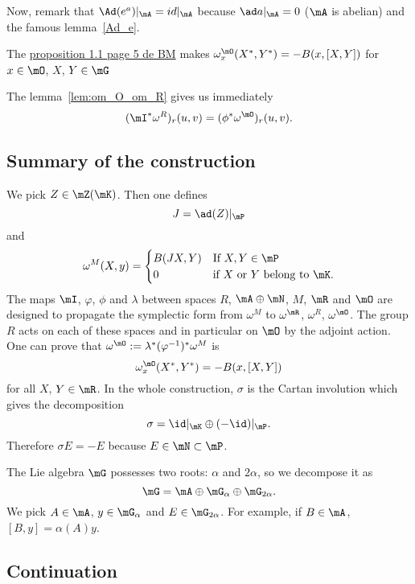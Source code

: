 Now, remark that $\Ad(e^a)|_{\mA}=id|_{\mA}$ because $\ad a|_{\mA}=0$ ($\mA$ is abelian) and
the famous lemma~\ref{Ad_e}.

The \underline{proposition 1.1 page 5 de BM} makes $\omega_x^{\mO}(X^*,Y^*)=-B(x,[X,Y])$ for $x\in\mO$, $X$, $Y\in\mG$

The lemma~\ref{lem:om_O_om_R} gives us immediately
\[
   (\mI^*\omega^R)_r(u,v)=(\phi^*\omega^{\mO})_r(u,v).
\]
\subsection{Summary of the construction}

We pick $Z\in\mZ(\mK)$. Then one defines
\[
  J=\ad(Z)|_{\mP}
\]
and
\[
  \omega^M(X,y)=
\begin{cases}
 B(JX,Y)&\text{If }X,Y\in\mP\\
 0&\text{if }X \text{ or } Y \text{ belong to }\mK.
\end{cases}
\]
The maps $\mI$, $\varphi$, $\phi$ and $\lambda$ between spaces $R$, $\mA\oplus\mN$, $M$, $\mR$ and $\mO$ are designed to propagate the symplectic form from $\omega^M$ to $\omega^{\mR}$, $\omega^R$, $\omega^{\mO}$. The group $R$ acts on each of these spaces and in particular on $\mO$ by the adjoint action. One can prove that $\omega^{\mO}:=\lambda^*(\varphi^{-1})^*\omega^M$ is
\[
  \omega^{\mO}_x(X^*,Y^*)=-B(x,[X,Y])
\]
for all $X$, $Y\in\mR$. In the whole construction, $\sigma$ is the Cartan involution which gives the decomposition
\[
  \sigma=\id|_{\mK}\oplus(-\id)|_{\mP}.
\]
Therefore $\sigma E=-E$ because $E\in\mN\subset\mP$.

The Lie algebra $\mG$ possesses two roots: $\alpha$ and $2\alpha$, so we decompose it as
\[
  \mG=\mA\oplus\mG_{\alpha}\oplus\mG_{2\alpha}.
\]
We pick $A\in\mA$, $y\in\mG_{\alpha}$ and $E\in\mG_{2\alpha}$. For example, if $B\in \mA$, $[B,y]=\alpha(A)y$.

\subsection{Continuation}

